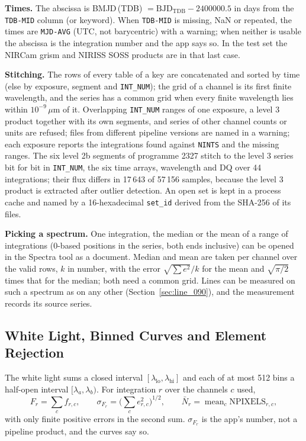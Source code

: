 \documentclass[11pt,a4paper]{article}
\newcommand{\code}[1]{\texttt{\small #1}}
\begin{document}
    \textbf{Times.} The abscissa is BMJD\,(TDB) $= \text{BJD}_{\text{TDB}} - 2400000.5$ in days from the \code{TDB-MID} column (or keyword). When \code{TDB-MID} is missing, NaN or repeated, the times are \code{MJD-AVG} (UTC, not barycentric) with a warning; when neither is usable the abscissa is the integration number and the app says so. In the test set the NIRCam grism and NIRISS SOSS products are in that last case.

    \textbf{Stitching.} The rows of every table of a key are concatenated and sorted by time (else by exposure, segment and \code{INT\_NUM}); the grid of a channel is its first finite wavelength, and the series has a common grid when every finite wavelength lies within $10^{-9}\,\mu$m of it. Overlapping \code{INT\_NUM} ranges of one exposure, a level 3 product together with its own segments, and series of other channel counts or units are refused; files from different pipeline versions are named in a warning; each exposure reports the integrations found against \code{NINTS} and the missing ranges. The six level 2b segments of programme 2327 stitch to the level 3 series bit for bit in \code{INT\_NUM}, the six time arrays, wavelength and DQ over 44 integrations; their flux differs in 17\,643 of 57\,156 samples, because the level 3 product is extracted after outlier detection. An open set is kept in a process cache and named by a 16-hexadecimal \code{set\_id} derived from the SHA-256 of its files.

    \textbf{Picking a spectrum.} One integration, the median or the mean of a range of integrations (0-based positions in the series, both ends inclusive) can be opened in the Spectra tool as a document. Median and mean are taken per channel over the valid rows, $k$ in number, with the error $\sqrt{\sum e^2}/k$ for the mean and $\sqrt{\pi/2}$ times that for the median; both need a common grid. Lines can be measured on such a spectrum as on any other (Section~\ref{sec:line_090}), and the measurement records its source series.

    \subsection{White Light, Binned Curves and Element Rejection}
    \label{sec:tso_curves}

    The white light sums a closed interval $[\lambda_{\text{lo}}, \lambda_{\text{hi}}]$ and each of at most 512 bins a half-open interval $[\lambda_a, \lambda_b)$. For integration $r$ over the channels $c$ used,
    \begin{equation}
        F_r = \sum_{c} f_{r,c}, \qquad \sigma_{F_r} = \Big(\sum_{c} e_{r,c}^2\Big)^{1/2}, \qquad \bar{N}_r = \operatorname{mean}_c \text{NPIXELS}_{r,c},
    \end{equation}
    with only finite positive errors in the second sum. $\sigma_{F_r}$ is the app's number, not a pipeline product, and the curves say so.
\end{document}
